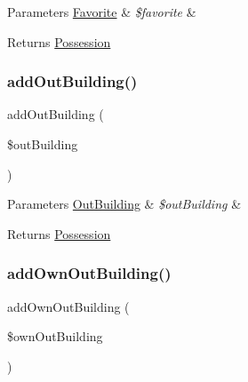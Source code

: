 \begin{DoxyParams}[1]{Parameters}
\mbox{\hyperlink{class_app_1_1_entity_1_1_favorite}{Favorite}} & {\em \$favorite} & \\
\hline
\end{DoxyParams}
\begin{DoxyReturn}{Returns}
\mbox{\hyperlink{class_app_1_1_entity_1_1_possession}{Possession}} 
\end{DoxyReturn}
\mbox{\label{class_app_1_1_entity_1_1_possession_aeb68d3c9f42f5aa840a9e8eb2120fc30}} 
\subsubsection{\texorpdfstring{addOutBuilding()}{addOutBuilding()}}
{\footnotesize\ttfamily add\+Out\+Building (\begin{DoxyParamCaption}\item[{\mbox{\hyperlink{class_app_1_1_entity_1_1_out_building}{Out\+Building}}}]{\$out\+Building }\end{DoxyParamCaption})}


\begin{DoxyParams}[1]{Parameters}
\mbox{\hyperlink{class_app_1_1_entity_1_1_out_building}{Out\+Building}} & {\em \$out\+Building} & \\
\hline
\end{DoxyParams}
\begin{DoxyReturn}{Returns}
\mbox{\hyperlink{class_app_1_1_entity_1_1_possession}{Possession}} 
\end{DoxyReturn}
\mbox{\label{class_app_1_1_entity_1_1_possession_a494be730fc915817fdc2643ccae26715}} 
\subsubsection{\texorpdfstring{addOwnOutBuilding()}{addOwnOutBuilding()}}
{\footnotesize\ttfamily add\+Own\+Out\+Building (\begin{DoxyParamCaption}\item[{\mbox{\hyperlink{class_app_1_1_entity_1_1_own_out_building}{Own\+Out\+Building}}}]{\$own\+Out\+Building }\end{DoxyParamCaption})}


